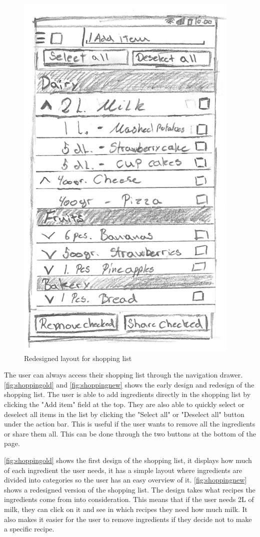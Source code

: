\begin{figure}[H]
\begin{minipage}[b]{0.5\columnwidth}
\includegraphics[width=0.7\columnwidth]{img/prototypes/shopping_list_new.pdf}
\caption{Redesigned layout for shopping list\label{fig:shoppingnew}}
\end{minipage}
\end{figure}

The user can always access their shopping list through the navigation drawer. \autoref{fig:shoppingold} and \autoref{fig:shoppingnew} shows the early design and redesign of the shopping list. The user is able to add ingredients directly in the shopping list by clicking the "Add item" field at the top. They are also able to quickly select or deselect all items in the list by clicking the "Select all" or "Deselect all" button under the action bar. This is useful if the user wants to remove all the ingredients or share them all. This can be done through the two buttons at the bottom of the page.

\autoref{fig:shoppingold} shows the first design of the shopping list, it displays how much of each ingredient the user needs, it has a simple layout where ingredients are divided into categories so the user has an easy overview of it. \autoref{fig:shoppingnew} shows a redesigned version of the shopping list. The design takes what recipes the ingredients come from into consideration. This means that if the user needs 2L of milk, they can click on it and see in which recipes they need how much milk. It also makes it easier for the user to remove ingredients if they decide not to make a specific recipe.

